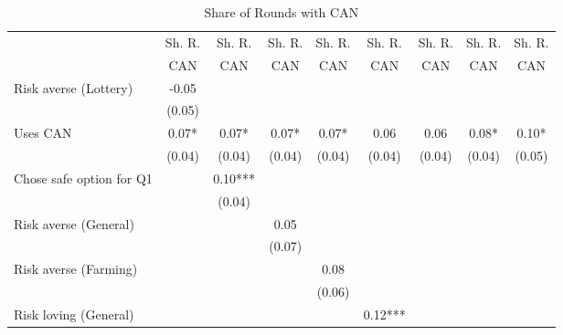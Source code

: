 \begin{table}[htbp]
\centering
\hspace*{-1.2cm}
\begin{threeparttable}
\small
\caption{Share of Rounds with CAN}
\label{tab:B5can}
\begin{tabular}{l cccccccc}
\hline
\hline
& Sh. R. & Sh. R. & Sh. R. & Sh. R. & Sh. R. & Sh. R. & Sh. R. & Sh. R. \\
& CAN& CAN& CAN& CAN& CAN& CAN& CAN& CAN \\ \hline
Risk averse (Lottery)&       -0.05   &               &               &               &               &               &               &               \\
                    &      (0.05)   &               &               &               &               &               &               &               \\
Uses CAN            &        0.07*  &        0.07*  &        0.07*  &        0.07*  &        0.06   &        0.06   &        0.08*  &        0.10*  \\
                    &      (0.04)   &      (0.04)   &      (0.04)   &      (0.04)   &      (0.04)   &      (0.04)   &      (0.04)   &      (0.05)   \\
Chose safe option for Q1&               &        0.10***&               &               &               &               &               &               \\
                    &               &      (0.04)   &               &               &               &               &               &               \\
Risk averse (General)&               &               &        0.05   &               &               &               &               &               \\
                    &               &               &      (0.07)   &               &               &               &               &               \\
Risk averse (Farming)&               &               &               &        0.08   &               &               &               &               \\
                    &               &               &               &      (0.06)   &               &               &               &               \\
Risk loving (General)&               &               &               &               &        0.12***&               &               &               \\

\end{tabular}
\end{threeparttable}
\end{table}
